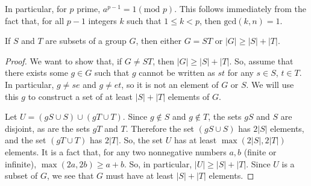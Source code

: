 \documentclass[12pt]{article}
\theoremstyle{definition}
\newenvironment{problem}[2][Problem]{\begin{trivlist}
\item[\hskip \labelsep {\bfseries #1}\hskip \labelsep {\bfseries #2.}]}{\end{trivlist}}
\begin{document}
In particular, for $p$ prime, $a^{p-1} = 1 (\text{mod }p)$. This follows immediately from the fact that, for all $p-1$ integers $k$ such that $1 \leq k < p$, then $\text{gcd}(k,n) = 1$. 
\begin{problem}{5}
If $S$ and $T$ are subsets of a group $G$, then either $G = ST$ or $\lvert G \rvert \geq \lvert S \rvert + \lvert T \rvert$.
\begin{proof}
	We want to show that, if $G \neq ST$, then $\left \lvert { G } \right \lvert \geq \left \lvert { S } \right \lvert  + \left \lvert { T } \right \lvert $. So, assume that there exists some $g \in G$ such that $g$ cannot be written as $st$ for any $s \in S$, $t \in T$. In particular, $g \neq se$ and $g \neq et$, so it is not an element of $G$ or $S$. We will use this $g$ to construct a set of at least $\left \lvert { S } \right \lvert  + \left \lvert { T } \right \lvert $ elements of $G$.
	\par Let $U = (gS \cup S) \cup (gT \cup T)$. Since $g \notin S$ and $g \notin T $, the sets $gS$ and $S$ are disjoint, as are the sets $gT$ and $T$. Therefore the set $(gS \cup S)$ has $2\left \lvert { S } \right \lvert $ elements, and the set $(gT \cup T)$ has $2\left \lvert { T } \right \lvert $. So, the set $U$ has at least $\max(2\left \lvert { S } \right \lvert , 2\left \lvert { T } \right \lvert )$ elements. It is a fact that, for any two nonnegative numbers $a,b$ (finite or infinite), $\max(2a, 2b) \geq a + b$. So, in particular, $\left \lvert { U } \right \lvert \geq \left \lvert { S } \right \lvert +\left \lvert { T } \right \lvert $. Since $U$ is a subset of $G$, we see that $G$ must have at least $\left \lvert { S } \right \lvert +\left \lvert { T } \right \lvert $ elements.
\end{proof}
\end{problem}
\end{document}
